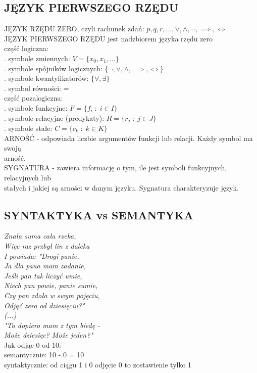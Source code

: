 \documentclass{article}
\begin{document}
\subsection{JĘZYK PIERWSZEGO RZĘDU}
{\color{emp}JĘZYK RZĘDU ZERO}, czyli rachunek zdań: $p, q, r, ..., \lor, \land, \neg, \implies, \iff$\bigskip\\
{\color{emp}JĘZYK PIERWSZEGO RZĘDU} jest nadzbiorem języka rzędu zero\medskip\\
{\color{acc}część logiczna:}\smallskip\\
    . symbole zmiennych: $V=\{x_0, x_1, ...\}$\\
    . symbole spójników logicznych: $\{\neg, \lor, \land, \implies, \iff\}$\\
    . symbole kwantyfikatorów: $\{\forall, \exists\}$\\
    . symbol równości: =\medskip\\
{\color{acc}część pozalogiczna:}\smallskip\\
    . symbole funkcyjne: $F=\{f_i\;:\;i\in I\}$\\
    . symbole relacyjne (predykaty): $R=\{r_j\;:\;j\in J\}$\\
    . symbole stałe: $C=\{c_k\;:\; k\in K\}$\medskip\\
{\color{def}ARNOŚĆ} - odpowiada liczbie argumentów funkcji lub relacji. Każdy symbol ma swoją \\arność.\smallskip\\
{\color{def}SYGNATURA} - zawiera informację o tym, ile jest symboli funkcyjnych, relacyjnych lub \\stałych i jakiej są arności w danym języku. Sygnatura charakteryzuje język.

\subsection{SYNTAKTYKA vs SEMANTYKA}
\emph{Znała suma cała rzeka,\\ 
Więc raz przbył lin z daleka\\
I powiada: "Drogi panie,\\
Ja dla pana mam zadanie,\\
Jeśli pan tak liczyć umie,\\
Niech pan powie, panie sumie,\\
Czy pan zdoła w swym pojęciu,\\
Odjąć zero od dziesięciu?"\\
(...)\\
"To dopiero mam z tym biedę - \\
Może dziesięc? Może jeden?" }\medskip\\
Jak odjąc 0 od 10:\\
    \indent semantycznie: 10 - 0 = 10\\
    \indent syntaktycznie: od ciągu 1 i 0 odjęcie 0 to zostawienie tylko 1\bigskip\\
\end{document}
